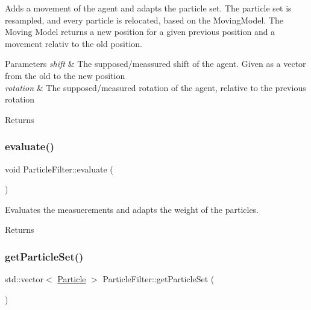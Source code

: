 Adds a movement of the agent and adapts the particle set. The particle set is resampled, and every particle is relocated, based on the Moving\+Model. The Moving Model returns a new position for a given previous position and a movement relativ to the old position. 


\begin{DoxyParams}{Parameters}
{\em shift} & The supposed/meassured shift of the agent. Given as a vector from the old to the new position \\
\hline
{\em rotation} & The supposed/measured rotation of the agent, relative to the previous rotation\\
\hline
\end{DoxyParams}
\begin{DoxyReturn}{Returns}

\end{DoxyReturn}
\mbox{\label{classParticleFilter_a7cbb0bc65397e8a5a39d5ec23909e94d}} 
\subsubsection{\texorpdfstring{evaluate()}{evaluate()}}
{\footnotesize\ttfamily void Particle\+Filter\+::evaluate (\begin{DoxyParamCaption}{ }\end{DoxyParamCaption})}



Evaluates the measuerements and adapts the weight of the particles. 

\begin{DoxyReturn}{Returns}

\end{DoxyReturn}
\mbox{\label{classParticleFilter_af7340c9e67bf47622d45f26f85e3deeb}} 
\subsubsection{\texorpdfstring{get\+Particle\+Set()}{getParticleSet()}}
{\footnotesize\ttfamily std\+::vector$<$ \hyperlink{classParticle}{Particle} $>$ Particle\+Filter\+::get\+Particle\+Set (\begin{DoxyParamCaption}{ }\end{DoxyParamCaption})}



